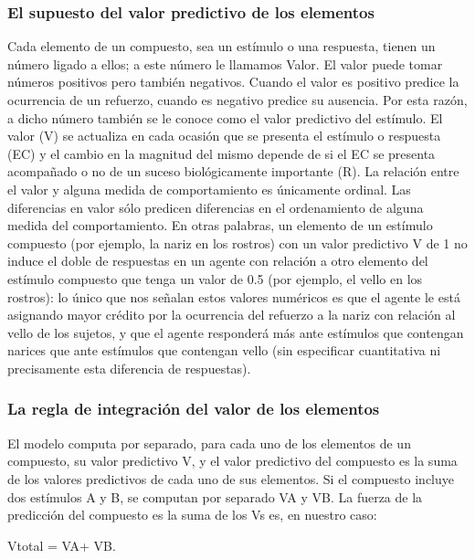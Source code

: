 \documentclass[
  a4paper,
  DIV=11,
  numbers=noendperiod]{scrreprt}
\begin{document}
\subsubsection{El supuesto del valor predictivo de los
elementos}\label{el-supuesto-del-valor-predictivo-de-los-elementos}

Cada elemento de un compuesto, sea un estímulo o una respuesta, tienen
un número ligado a ellos; a este número le llamamos Valor. El valor
puede tomar números positivos pero también negativos. Cuando el valor es
positivo predice la ocurrencia de un refuerzo, cuando es negativo
predice su ausencia. Por esta razón, a dicho número también se le conoce
como el valor predictivo del estímulo. El valor (V) se actualiza en cada
ocasión que se presenta el estímulo o respuesta (EC) y el cambio en la
magnitud del mismo depende de si el EC se presenta acompañado o no de un
suceso biológicamente importante (R). La relación entre el valor y
alguna medida de comportamiento es únicamente ordinal. Las diferencias
en valor sólo predicen diferencias en el ordenamiento de alguna medida
del comportamiento. En otras palabras, un elemento de un estímulo
compuesto (por ejemplo, la nariz en los rostros) con un valor predictivo
V de 1 no induce el doble de respuestas en un agente con relación a otro
elemento del estímulo compuesto que tenga un valor de 0.5 (por ejemplo,
el vello en los rostros): lo único que nos señalan estos valores
numéricos es que el agente le está asignando mayor crédito por la
ocurrencia del refuerzo a la nariz con relación al vello de los sujetos,
y que el agente responderá más ante estímulos que contengan narices que
ante estímulos que contengan vello (sin especificar cuantitativa ni
precisamente esta diferencia de respuestas).

\subsubsection{La regla de integración del valor de los
elementos}\label{la-regla-de-integraciuxf3n-del-valor-de-los-elementos}

El modelo computa por separado, para cada uno de los elementos de un
compuesto, su valor predictivo V, y el valor predictivo del compuesto es
la suma de los valores predictivos de cada uno de sus elementos. Si el
compuesto incluye dos estímulos A y B, se computan por separado VA y VB.
La fuerza de la predicción del compuesto es la suma de los Vs es, en
nuestro caso:

Vtotal = VA+ VB.
\end{document}
